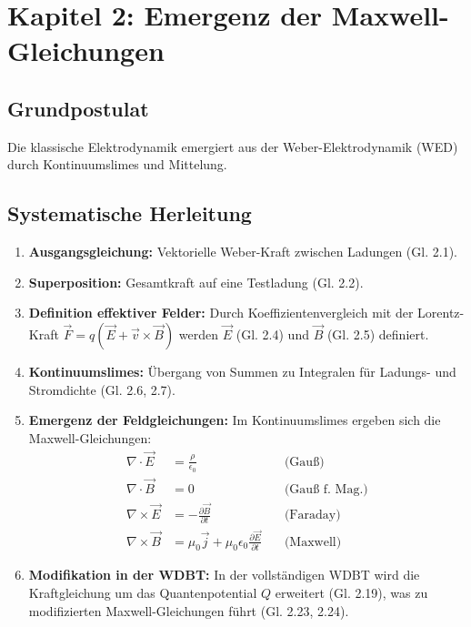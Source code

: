 \documentclass[10pt,a4paper]{article}
\begin{document}
\section{Kapitel 2: Emergenz der Maxwell-Gleichungen}

\subsection*{Grundpostulat}
Die klassische Elektrodynamik emergiert aus der Weber-Elektrodynamik (WED) durch Kontinuumslimes und Mittelung.

\subsection*{Systematische Herleitung}
\begin{enumerate}
    \item \textbf{Ausgangsgleichung:} Vektorielle Weber-Kraft zwischen Ladungen (Gl. 2.1).
    \item \textbf{Superposition:} Gesamtkraft auf eine Testladung (Gl. 2.2).
    \item \textbf{Definition effektiver Felder:} Durch Koeffizientenvergleich mit der Lorentz-Kraft $\vec{F} = q(\vec{E} + \vec{v} \times \vec{B})$ werden $\vec{E}$ (Gl. 2.4) und $\vec{B}$ (Gl. 2.5) definiert.
    \item \textbf{Kontinuumslimes:} Übergang von Summen zu Integralen für Ladungs- und Stromdichte (Gl. 2.6, 2.7).
    \item \textbf{Emergenz der Feldgleichungen:} Im Kontinuumslimes ergeben sich die Maxwell-Gleichungen:
        \begin{align*}
            \nabla \cdot \vec{E} &= \frac{\rho}{\epsilon_0} \quad &\text{(Gauß)} \\
            \nabla \cdot \vec{B} &= 0 \quad &\text{(Gauß f. Mag.)} \\
            \nabla \times \vec{E} &= -\frac{\partial \vec{B}}{\partial t} \quad &\text{(Faraday)} \\
            \nabla \times \vec{B} &= \mu_0 \vec{j} + \mu_0 \epsilon_0 \frac{\partial \vec{E}}{\partial t} \quad &\text{(Maxwell)}
        \end{align*}
    \item \textbf{Modifikation in der WDBT:} In der vollständigen WDBT wird die Kraftgleichung um das Quantenpotential $Q$ erweitert (Gl. 2.19), was zu modifizierten Maxwell-Gleichungen führt (Gl. 2.23, 2.24).
\end{enumerate}
\end{document}
